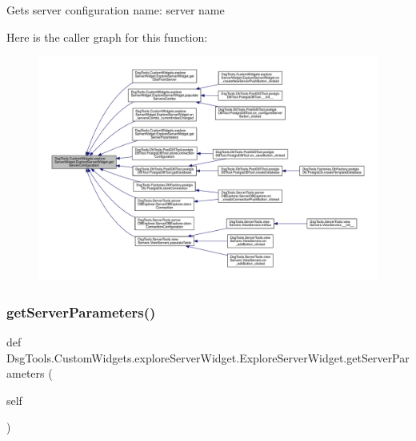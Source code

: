 \begin{DoxyVerb}Gets server configuration
name: server name 
\end{DoxyVerb}
 Here is the caller graph for this function\+:
\nopagebreak
\begin{figure}[H]
\begin{center}
\leavevmode
\includegraphics[width=350pt]{class_dsg_tools_1_1_custom_widgets_1_1explore_server_widget_1_1_explore_server_widget_ae76906b263b378952f3fd1e967c83482_icgraph}
\end{center}
\end{figure}
\mbox{\label{class_dsg_tools_1_1_custom_widgets_1_1explore_server_widget_1_1_explore_server_widget_a701ec96fe40f3535ab4c9df4bdaec972}} 
\subsubsection{\texorpdfstring{get\+Server\+Parameters()}{getServerParameters()}}
{\footnotesize\ttfamily def Dsg\+Tools.\+Custom\+Widgets.\+explore\+Server\+Widget.\+Explore\+Server\+Widget.\+get\+Server\+Parameters (\begin{DoxyParamCaption}\item[{}]{self }\end{DoxyParamCaption})}

